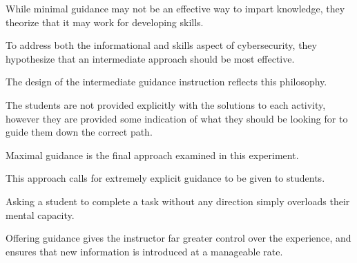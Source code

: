 While minimal guidance may not be an effective way to impart knowledge, they theorize that it may work for developing skills. %







To address both the informational and skills aspect of cybersecurity, they hypothesize that an intermediate approach should be most effective. 















        The design of the intermediate guidance instruction reflects this philosophy. %







The students are not provided explicitly with the solutions to each activity, however they are provided some indication of what they should be looking for to guide them down the correct path.






















        Maximal guidance is the final approach examined in this experiment. %







This approach calls for extremely explicit guidance to be given to students. %







Asking a student to complete a task without any direction simply overloads their mental capacity. %







Offering guidance gives the instructor far greater control over the experience, and ensures that new information is introduced at a manageable rate. 















